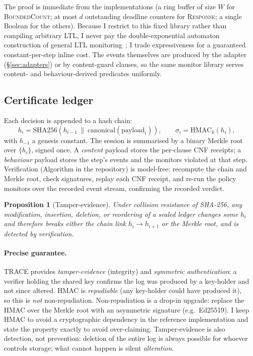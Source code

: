 \documentclass[11pt]{article}
\newtheorem{proposition}{Proposition}
\begin{document}
The proof is immediate from the implementations (a ring buffer of size $W$ for
\textsc{BoundedCount}; at most $d$ outstanding deadline counters for
\textsc{Response}; a single Boolean for the others). Because I restrict to this
fixed library rather than compiling arbitrary LTL, I never pay the
double-exponential automaton construction of general LTL
monitoring~\citep{bauer2011ltl3}; I trade expressiveness for a guaranteed
constant-per-step inline cost. The events themselves are produced by the adapter
(\S\ref{sec:adapters}) or by content-guard clauses, so the same monitor library
serves content- and behaviour-derived predicates uniformly.

\subsection{Certificate ledger}
\label{sec:ledger}

Each decision is appended to a hash chain:
\[
h_i = \mathrm{SHA256}\!\left(h_{i-1}\ \|\ \mathrm{canonical}(\text{payload}_i)\right),
\qquad \sigma_i = \mathrm{HMAC}_{k}(h_i),
\]
with $h_{-1}$ a genesis constant. The session is summarised by a binary Merkle
root over $\{h_i\}$, signed once. A \emph{content} payload stores the per-clause
CNF receipts; a \emph{behaviour} payload stores the step's events and the
monitors violated at that step. Verification (Algorithm in the repository) is
model-free: recompute the chain and Merkle root, check signatures, replay each
CNF receipt, and re-run the policy monitors over the recorded event stream,
confirming the recorded verdict.

\begin{proposition}[Tamper-evidence]
\label{prop:tamper}
Under collision resistance of SHA-256, any modification, insertion, deletion, or
reordering of a sealed ledger changes some $h_i$ and therefore breaks either the
chain link $h_{i}\!\rightarrow\!h_{i+1}$ or the Merkle root, and is detected by
verification.
\end{proposition}

\paragraph{Precise guarantee.} TRACE provides \emph{tamper-evidence} (integrity)
and \emph{symmetric authentication}: a verifier holding the shared key confirms
the log was produced by a key-holder and not since altered. HMAC is
\emph{repudiable} (any key-holder could have produced it), so this is
\emph{not} non-repudiation. Non-repudiation is a drop-in upgrade: replace the
HMAC over the Merkle root with an asymmetric signature (e.g.\ Ed25519). I keep
HMAC to avoid a cryptographic dependency in the reference implementation and
state the property exactly to avoid over-claiming. Tamper-evidence is also
detection, not prevention: deletion of the entire log is always possible for
whoever controls storage; what cannot happen is silent \emph{alteration}.
\end{document}
